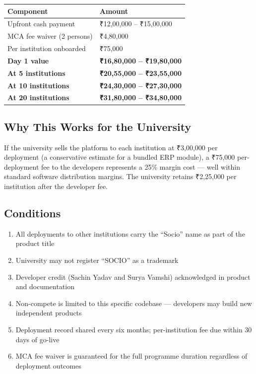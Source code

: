 \documentclass[12pt,a4paper]{article}
\begin{document}
\begin{tabularx}{\textwidth}{L{5.5cm} X}
\toprule
{}
\textbf{Component} & \textbf{Amount} \\
\midrule
Upfront cash payment & ₹12,00,000 – ₹15,00,000 \\
MCA fee waiver (2 persons) & ₹4,80,000 \\
Per institution onboarded & ₹75,000 \\
\textbf{Day 1 value} & \textbf{₹16,80,000 – ₹19,80,000} \\
\textbf{At 5 institutions} & \textbf{₹20,55,000 – ₹23,55,000} \\
\textbf{At 10 institutions} & \textbf{₹24,30,000 – ₹27,30,000} \\
\textbf{At 20 institutions} & \textbf{₹31,80,000 – ₹34,80,000} \\
\bottomrule
\end{tabularx}

\vspace{0.4cm}

\subsection*{Why This Works for the University}

If the university sells the platform to each institution at ₹3,00,000 per deployment (a conservative estimate for a bundled ERP module), a ₹75,000 per-deployment fee to the developers represents a 25\% margin cost — well within standard software distribution margins. The university retains ₹2,25,000 per institution after the developer fee.

\subsection*{Conditions}
\begin{enumerate}[leftmargin=*, noitemsep]
    \item All deployments to other institutions carry the ``Socio'' name as part of the product title
    \item University may not register ``SOCIO'' as a trademark
    \item Developer credit (Sachin Yadav and Surya Vamshi) acknowledged in product and documentation
    \item Non-compete is limited to this specific codebase — developers may build new independent products
    \item Deployment record shared every six months; per-institution fee due within 30 days of go-live
    \item MCA fee waiver is guaranteed for the full programme duration regardless of deployment outcomes
\end{enumerate}
\end{document}
